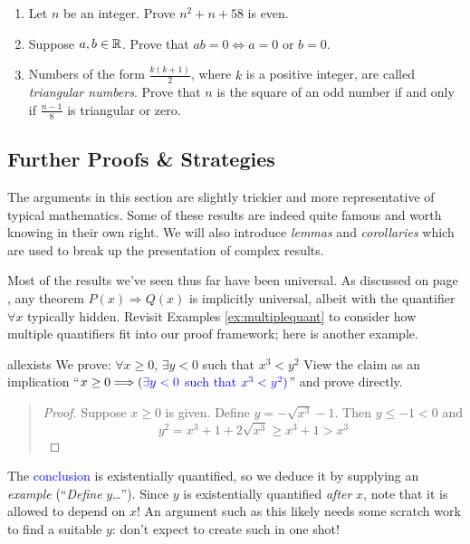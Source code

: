 \begin{exercises}{}{}
\begin{enumerate}
    
    \item Let $n$ be an integer. Prove $n^2+n+58$ is even. 

  
		\item\label{exs:zerofactor} Suppose $a,b\in\mathbb{R}$. Prove that $ab=0\iff a=0$ or $b=0$.
  
    
    \item Numbers of the form $\frac{k(k+1)}2$, where $k$ is a positive integer, are called \emph{triangular numbers}. Prove that $n$ is the square of an odd number if and only if $\frac{n-1}{8}$ is triangular or zero.
         
	\end{enumerate}
\end{exercises}


\clearpage




\subsection{Further Proofs \& Strategies}\label{sec:proof2}


The arguments in this section are slightly trickier and more representative of typical mathematics. Some of these results are indeed quite famous and worth knowing in their own right. We will also introduce \emph{lemmas} and \emph{corollaries} which are used to break up the presentation of complex results.



Most of the results we've seen thus far have been universal. As discussed on page \pageref{pg:univproof}, any theorem $P(x)\Longrightarrow Q(x)$ is implicitly universal, albeit with the quantifier $\forall x$ typically hidden. Revisit Examples \ref{ex:multiplequant} to consider how multiple quantifiers fit into our proof framework; here is another example.

\begin{example}{}{allexists}
	We prove: $\forall x\ge 0$, $\exists y<0$ such that $x^3<y^2$\medbreak
	View the claim as an implication ``$x\ge 0\Longrightarrow (\textcolor{blue}{\exists y<0}$ \textcolor{blue}{such that} $\textcolor{blue}{x^3<y^2)}$'' and prove directly.
	\begin{quote}
		\begin{proof}
			Suppose $x\ge 0$ is given. Define $y=-\sqrt{x^3}-1$. Then $y\le -1<0$ and 
			\[
				y^2=x^3+1+2\sqrt{x^3}\ge x^3+1>x^3 \tag*{\qedhere}
			\]
		\end{proof}
	\end{quote}
	The \textcolor{blue}{conclusion} is existentially quantified, so we deduce it by supplying an \emph{example} (``\emph{Define} $y$\ldots''). Since $y$ is existentially quantified \emph{after} $x$, note that it is allowed to depend on $x$!	An argument such as this likely needs some scratch work to find a suitable $y$: don't expect to create such in one shot!
\end{example}


